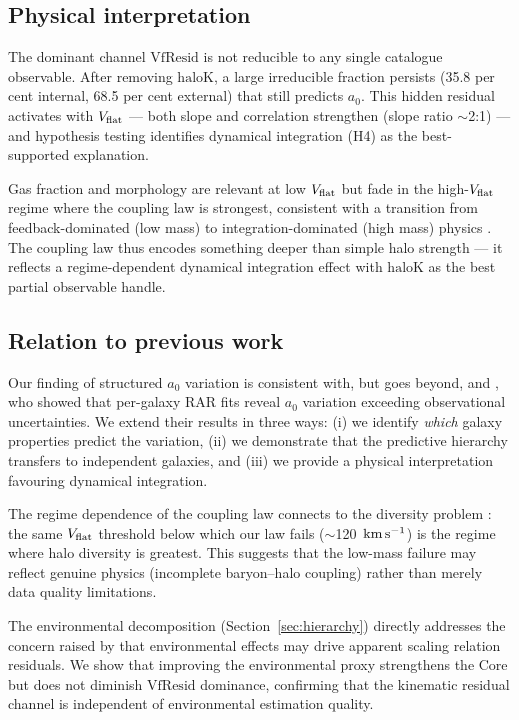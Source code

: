 \documentclass[fleqn,usenatbib]{mnras}
\newcommand{\azero}{a_0}
\newcommand{\vflat}{V_{\rm flat}}
\newcommand{\vfresid}{\mathrm{VfResid}}
\newcommand{\haloK}{\mathrm{haloK}}
\newcommand{\kms}{{\rm km\,s^{-1}}}
\begin{document}
\subsection{Physical interpretation}
\label{sec:physinterp}

The dominant channel $\vfresid$ is not reducible to any single catalogue
observable. After removing $\haloK$, a large irreducible fraction persists
(35.8 per cent internal, 68.5 per cent external) that still predicts
$\azero$. This hidden residual activates with $\vflat$ --- both slope
and correlation strengthen (slope ratio $\sim$2:1) --- and hypothesis
testing identifies dynamical integration (H4) as the best-supported
explanation.

Gas fraction and morphology are relevant at low $\vflat$ but fade in the
high-$\vflat$ regime where the coupling law is strongest, consistent with
a transition from feedback-dominated (low mass) to integration-dominated
(high mass) physics \citep{DiCintio2014, Katz2017}. The coupling law thus
encodes something deeper than simple halo strength --- it reflects a
regime-dependent dynamical integration effect with $\haloK$ as the best
partial observable handle.

\subsection{Relation to previous work}
\label{sec:previous}

Our finding of structured $\azero$ variation is consistent with, but goes
beyond, \citet{Rodrigues2018} and \citet{Li2018}, who showed that
per-galaxy RAR fits reveal $\azero$ variation exceeding observational
uncertainties. We extend their results in three ways: (i) we identify
\emph{which} galaxy properties predict the variation, (ii) we demonstrate
that the predictive hierarchy transfers to independent galaxies, and
(iii) we provide a physical interpretation favouring dynamical integration.

The regime dependence of the coupling law connects to the diversity problem
\citep{Oman2015, Santos-Santos2020}: the same $\vflat$ threshold below
which our law fails ($\sim$120~$\kms$) is the regime where halo diversity
is greatest. This suggests that the low-mass failure may reflect genuine
physics (incomplete baryon--halo coupling) rather than merely data quality
limitations.

The environmental decomposition (Section~\ref{sec:hierarchy}) directly
addresses the concern raised by \citet{Desmond2017} that environmental
effects may drive apparent scaling relation residuals. We show that
improving the environmental proxy strengthens the Core but does not
diminish $\vfresid$ dominance, confirming that the kinematic residual
channel is independent of environmental estimation quality.
\end{document}
